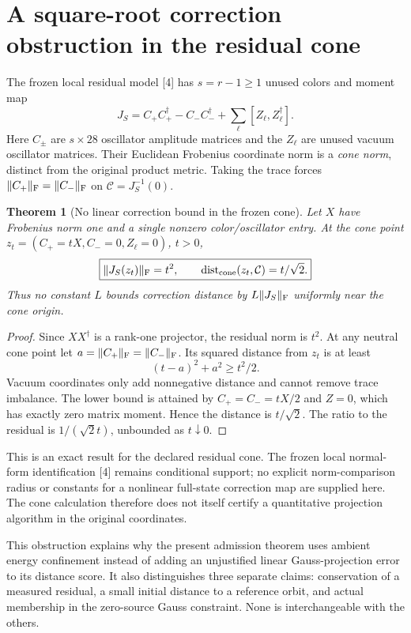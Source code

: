 \documentclass[11pt,a4paper]{article}
\newtheorem{theorem}{Theorem}\newtheorem{lemma}[theorem]{Lemma}\newtheorem{corollary}[theorem]{Corollary}
\begin{document}
\section{A square-root correction obstruction in the residual cone}
The frozen local residual model [4] has $s=r-1\ge1$ unused colors and moment map
\[
J_S=C_+C_+^\dagger-C_-C_-^\dagger+\sum_\ell[Z_\ell,Z_\ell^\dagger].
\]
Here $C_\pm$ are $s\times28$ oscillator amplitude matrices and the $Z_\ell$ are unused vacuum oscillator matrices. Their Euclidean Frobenius coordinate norm is a \emph{cone norm}, distinct from the original product metric. Taking the trace forces $\|C_+\|_\mathrm F=\|C_-\|_\mathrm F$ on $\mathcal C=J_S^{-1}(0)$.
\begin{theorem}[No linear correction bound in the frozen cone]
Let $X$ have Frobenius norm one and a single nonzero color/oscillator entry. At the cone point $z_t=(C_+=tX,C_-=0,Z_\ell=0)$, $t>0$,
\[
\boxed{\|J_S(z_t)\|_\mathrm F=t^2,\qquad
\operatorname{dist}_{\rm cone}(z_t,\mathcal C)=t/\sqrt2.}
\]
Thus no constant $L$ bounds correction distance by $L\|J_S\|_\mathrm F$ uniformly near the cone origin.
\end{theorem}
\begin{proof}
Since $XX^\dagger$ is a rank-one projector, the residual norm is $t^2$. At any neutral cone point let $a=\|C_+\|_\mathrm F=\|C_-\|_\mathrm F$. Its squared distance from $z_t$ is at least
\[
(t-a)^2+a^2\ge t^2/2.
\]
Vacuum coordinates only add nonnegative distance and cannot remove trace imbalance. The lower bound is attained by $C_+=C_-=tX/2$ and $Z=0$, which has exactly zero matrix moment. Hence the distance is $t/\sqrt2$. The ratio to the residual is $1/(\sqrt2t)$, unbounded as $t\downarrow0$.
\end{proof}
This is an exact result for the declared residual cone. The frozen local normal-form identification [4] remains conditional support; no explicit norm-comparison radius or constants for a nonlinear full-state correction map are supplied here. The cone calculation therefore does not itself certify a quantitative projection algorithm in the original coordinates.

This obstruction explains why the present admission theorem uses ambient energy confinement instead of adding an unjustified linear Gauss-projection error to its distance score. It also distinguishes three separate claims: conservation of a measured residual, a small initial distance to a reference orbit, and actual membership in the zero-source Gauss constraint. None is interchangeable with the others.
\end{document}
